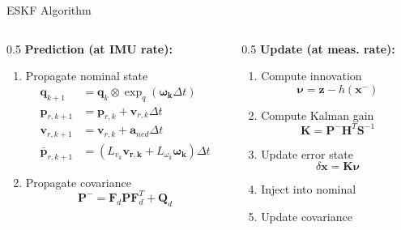 \documentclass{beamer}
\newcommand{\quat}{\mathbf{q}}
\begin{document}
\begin{frame}{ESKF Algorithm}
\begin{columns}
\begin{column}{0.5\textwidth}
\textbf{Prediction (at IMU rate):}
\begin{enumerate}
    \item Propagate nominal state
    \begin{align*}
        \quat_{k+1} &= \quat_k \otimes \exp_q(\bm{\omega_k}\Delta t) \\
        \mathbf{p}_{r,k+1} &= \mathbf{p}_{r,k} + \mathbf{v}_{r,k} \Delta t \\
        \mathbf{v}_{r,k+1} &= \mathbf{v}_{r,k} + \mathbf{a}_{ned} \Delta t \\
        \mathbf{\bar{p}}_{r,k+1} &= (L_{v_k} \bm{v_{r,k}} + L_{\omega_k} \bm{\omega_{k}}) \Delta t  
    \end{align*}
    \item Propagate covariance
    \begin{equation*}
        \mathbf{P}^- = \mathbf{F}_d \mathbf{P} \mathbf{F}_d^T + \mathbf{Q}_d
    \end{equation*}
\end{enumerate}
\end{column}

\begin{column}{0.5\textwidth}
\textbf{Update (at meas. rate):}
\begin{enumerate}
    \item Compute innovation
    \begin{equation*}
        \bm{\nu} = \mathbf{z} - h(\mathbf{x}^-)
    \end{equation*}
    \item Compute Kalman gain
    \begin{equation*}
        \mathbf{K} = \mathbf{P}^- \mathbf{H}^T \mathbf{S}^{-1}
    \end{equation*}
    \item Update error state
    \begin{equation*}
        \delta\mathbf{x} = \mathbf{K} \bm{\nu}
    \end{equation*}
    \item Inject into nominal
    \item Update covariance
\end{enumerate}
\end{column}
\end{columns}
\end{frame}
\end{document}

